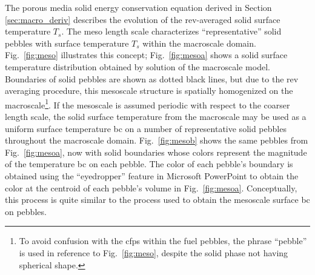 The porous media solid energy conservation equation derived in Section \ref{sec:macro_deriv} describes the evolution of the \gls{rev}-averaged solid surface temperature \(T_s\). The meso length scale characterizes ``representative'' solid pebbles with surface temperature \(T_s\) within the macroscale domain. Fig.\ \ref{fig:meso} illustrates this concept; Fig.\ \ref{fig:mesoa} shows a solid surface temperature distribution obtained by solution of the macroscale model. Boundaries of solid pebbles are shown as dotted black lines, but due to the \gls{rev} averaging procedure, this mesoscale structure is spatially homogenized on the macroscale\hspace{0.02cm}\footnote{To avoid confusion with the \glspl{cfp} within the fuel pebbles, the phrase ``pebble'' is used in reference to Fig.\ \ref{fig:meso}, despite the solid phase not having spherical shape.}. If the mesoscale is assumed periodic with respect to the coarser length scale, the solid surface temperature from the macroscale may be used as a uniform surface temperature \gls{bc} on a number of representative solid pebbles throughout the macroscale domain. Fig.\ \ref{fig:mesob} shows the same pebbles from Fig.\ \ref{fig:mesoa}, now with solid boundaries whose colors represent the magnitude of the temperature \gls{bc} on each pebble. The color of each pebble's boundary is obtained using the ``eyedropper'' feature in Microsoft PowerPoint to obtain the color at the centroid of each pebble's volume in Fig.\ \ref{fig:mesoa}. Conceptually, this process is quite similar to the process used to obtain the mesoscale surface \gls{bc} on pebbles.

